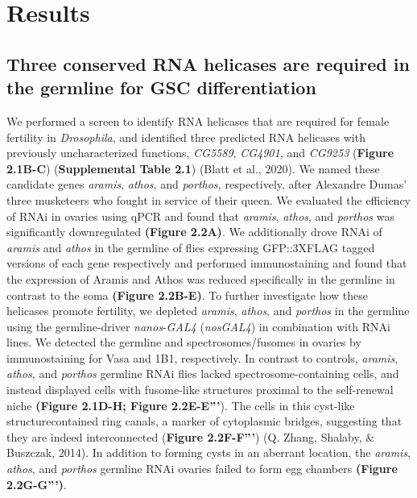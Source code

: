 \documentclass[12pt,oneside]{reedthesis}
\begin{document}
\hypertarget{results}{%
\section{Results}\label{results}}

\hypertarget{three-conserved-rna-helicases-are-required-in-the-germline-for-gsc-differentiation}{%
\subsection{Three conserved RNA helicases are required in the germline for GSC differentiation}\label{three-conserved-rna-helicases-are-required-in-the-germline-for-gsc-differentiation}}

We performed a screen to identify RNA helicases that are required for
female fertility in \emph{Drosophila}, and identified three predicted RNA
helicases with previously uncharacterized functions, \emph{CG5589}, \emph{CG4901,}
and \emph{CG9253} (\textbf{Figure 2.1B-C}) (\textbf{Supplemental Table 2.1})
(Blatt et al., 2020). We named these candidate genes
\emph{aramis}, \emph{athos}, and \emph{porthos,} respectively, after Alexandre Dumas'
three musketeers who fought in service of their queen. We evaluated the
efficiency of RNAi in ovaries using qPCR and found that \emph{aramis},
\emph{athos}, and \emph{porthos} was significantly downregulated \textbf{(Figure 2.2A)}.
We additionally drove RNAi of \emph{aramis} and \emph{athos} in the germline of
flies expressing GFP::3XFLAG tagged versions of each gene respectively
and performed immunostaining and found that the expression of Aramis and
Athos was reduced specifically in the germline in contrast to the soma
\textbf{(Figure 2.2B-E)}. To further investigate how these helicases promote
fertility, we depleted \emph{aramis}, \emph{athos}, and \emph{porthos} in the germline
using the germline-driver \emph{nanos}-\emph{GAL4} (\emph{nosGAL4}) in combination with
RNAi lines. We detected the germline and spectrosomes/fusomes in ovaries
by immunostaining for Vasa and 1B1, respectively. In contrast to
controls, \emph{aramis}, \emph{athos}, and \emph{porthos} germline RNAi flies lacked
spectrosome-containing cells, and instead displayed cells with
fusome-like structures proximal to the self-renewal niche \textbf{(Figure 2.1D-H; Figure 2.2E-E'''}).
The cells in this cyst-like structurecontained ring canals,
a marker of cytoplasmic bridges, suggesting that
they are indeed interconnected (\textbf{Figure 2.2F-F'''}) (Q. Zhang, Shalaby, \& Buszczak, 2014).
In addition to forming cysts in an aberrant location, the \emph{aramis},
\emph{athos}, and \emph{porthos} germline RNAi ovaries failed to form egg chambers
\textbf{(Figure 2.2G-G''')}.
\end{document}
